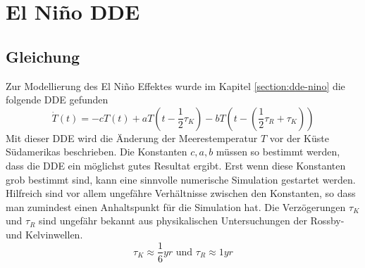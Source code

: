 \section{El Niño DDE}


\subsection{Gleichung}
Zur Modellierung des El Niño Effektes wurde im Kapitel \ref{section:dde-nino} die folgende DDE gefunden
\begin{equation} \label{eldde}
\dot{T}(t)=-cT(t)+aT(t-\frac{1}{2}\tau_K)-bT(t-(\frac{1}{2}\tau_R+\tau_K))
\end{equation}
Mit dieser DDE wird die Änderung der Meerestemperatur $T$ vor der Küste Südamerikas beschrieben.
Die Konstanten $c,a,b$ müssen so bestimmt werden, dass die DDE ein möglichst gutes Resultat ergibt.
Erst wenn diese Konstanten grob bestimmt sind, kann eine sinnvolle numerische Simulation gestartet werden.
Hilfreich sind vor allem ungefähre Verhältnisse zwischen den Konstanten, so dass man zumindest einen Anhaltspunkt für die Simulation hat.
Die Verzögerungen $\tau_K$ und $\tau_R$ sind ungefähr bekannt aus physikalischen Untersuchungen der Rossby- und Kelvinwellen.
\begin{equation}
	\tau_K \approx \frac{1}{6}yr \text{ und } \tau_R \approx 1 yr
\end{equation}


